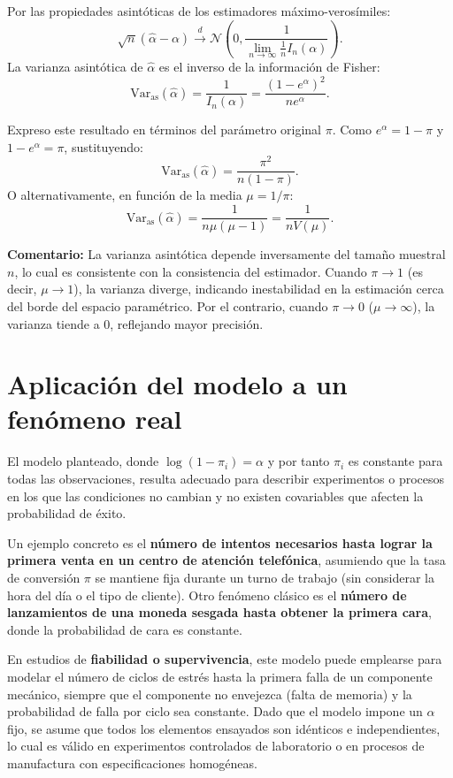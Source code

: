 \documentclass{article}
\begin{document}
Por las propiedades asintóticas de los estimadores máximo-verosímiles:
\begin{equation}
\sqrt{n}(\hat{\alpha} - \alpha) \xrightarrow{d} \mathcal{N}\left(0, \frac{1}{\lim_{n\to\infty} \frac{1}{n} I_n(\alpha)}\right).
\end{equation}
La varianza asintótica de $\hat{\alpha}$ es el inverso de la información de Fisher:
\begin{equation}
\text{Var}_{\text{as}}(\hat{\alpha}) = \frac{1}{I_n(\alpha)} = \frac{(1-e^\alpha)^2}{n e^\alpha}.
\end{equation}

Expreso este resultado en términos del parámetro original $\pi$. Como $e^\alpha = 1-\pi$ y $1-e^\alpha = \pi$, sustituyendo:
\begin{equation}
\boxed{\text{Var}_{\text{as}}(\hat{\alpha}) = \frac{\pi^2}{n(1-\pi)}}.
\end{equation}
O alternativamente, en función de la media $\mu = 1/\pi$:
\begin{equation}
\text{Var}_{\text{as}}(\hat{\alpha}) = \frac{1}{n\mu(\mu-1)} = \frac{1}{n V(\mu)}.
\end{equation}

\textbf{Comentario:} La varianza asintótica depende inversamente del tamaño muestral $n$, lo cual es consistente con la consistencia del estimador. Cuando $\pi \to 1$ (es decir, $\mu \to 1$), la varianza diverge, indicando inestabilidad en la estimación cerca del borde del espacio paramétrico. Por el contrario, cuando $\pi \to 0$ ($\mu \to \infty$), la varianza tiende a 0, reflejando mayor precisión.

\section{Aplicación del modelo a un fenómeno real}

El modelo planteado, donde $\log(1-\pi_i) = \alpha$ y por tanto $\pi_i$ es constante para todas las observaciones, resulta adecuado para describir experimentos o procesos en los que las condiciones no cambian y no existen covariables que afecten la probabilidad de éxito. 

Un ejemplo concreto es el \textbf{número de intentos necesarios hasta lograr la primera venta en un centro de atención telefónica}, asumiendo que la tasa de conversión $\pi$ se mantiene fija durante un turno de trabajo (sin considerar la hora del día o el tipo de cliente). Otro fenómeno clásico es el \textbf{número de lanzamientos de una moneda sesgada hasta obtener la primera cara}, donde la probabilidad de cara es constante.

En estudios de \textbf{fiabilidad o supervivencia}, este modelo puede emplearse para modelar el número de ciclos de estrés hasta la primera falla de un componente mecánico, siempre que el componente no envejezca (falta de memoria) y la probabilidad de falla por ciclo sea constante. Dado que el modelo impone un $\alpha$ fijo, se asume que todos los elementos ensayados son idénticos e independientes, lo cual es válido en experimentos controlados de laboratorio o en procesos de manufactura con especificaciones homogéneas.
\end{document}
